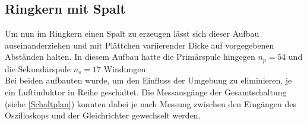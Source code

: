     \subsection*{Ringkern mit Spalt}
        Um nun im Ringkern einen Spalt zu erzeugen lässt sich dieser Aufbau auseinanderziehen und mit Plättchen variierender Dicke auf vorgegebenen Abständen halten.
        In diesem Aufbau hatte die Primärspule hingegen $n_p=54$ und die Sekundärspule $n_s=17$ Windungen\\
        
    Bei beiden aufbauten wurde, um den Einfluss der Umgebung zu eliminieren, je ein Luftinduktor in Reihe geschaltet. Die Messausgänge der Gesamtschaltung (siehe \ref{Schaltplan}) konnten 
    dabei je nach Messung zwischen den Eingängen des Oszilloskops und der Gleichrichter gewechselt werden.